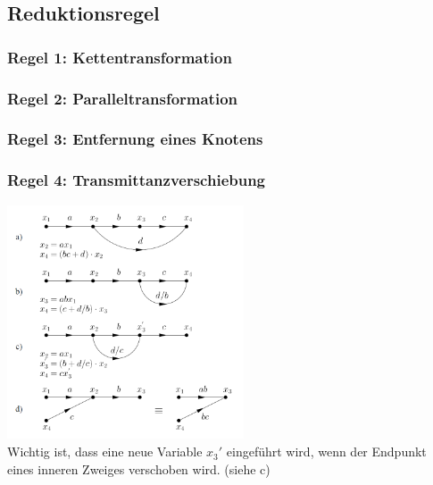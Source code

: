	  \subsection{Reduktionsregel }
	    \begin{multicols}{2}
	    
	      \subsubsection{Regel 1: Kettentransformation }
	      
	      \subsubsection{Regel 2: Paralleltransformation }
	      
	      \subsubsection{Regel 3: Entfernung eines Knotens }
	      
	      \subsubsection{Regel 4: Transmittanzverschiebung}
	        \includegraphics[width=7cm]{./bilder/transmittanzverschiebung.png} \\
	        Wichtig ist, dass eine neue Variable $x_3'$ eingeführt wird, wenn der Endpunkt eines
	        inneren Zweiges verschoben wird. \newline (siehe c)
	        \vfill
	    \columnbreak
	    

\end{multicols}
